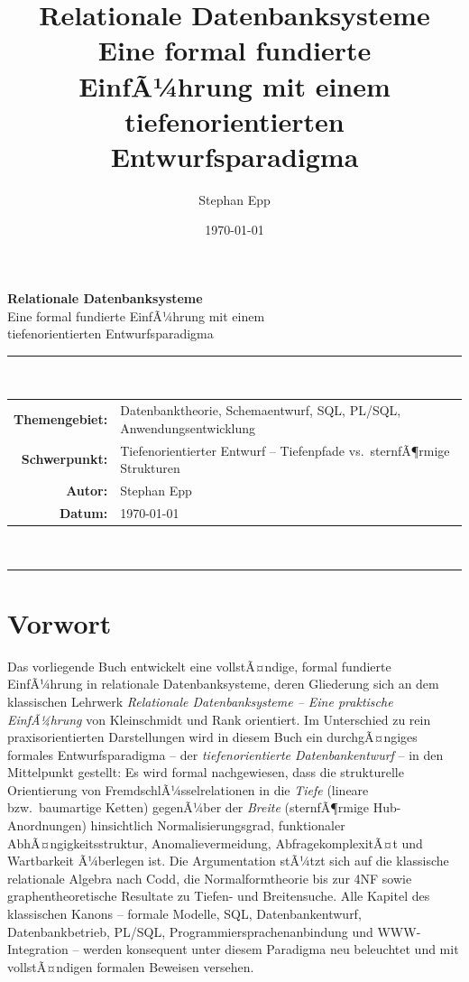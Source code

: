 ﻿\documentclass[a4paper,12pt]{report}
\title{Relationale Datenbanksysteme \\ \large Eine formal fundierte EinfÃ¼hrung mit
einem tiefenorientierten Entwurfsparadigma}
\author{Stephan Epp}
\date{\today}
\theoremstyle{definition}
\theoremstyle{remark}
\begin{document}
\begin{titlepage}
  \centering
  \vspace*{2cm}
  {\LARGE\bfseries Relationale Datenbanksysteme}\\[0.5em]
  {\Large Eine formal fundierte EinfÃ¼hrung mit einem\\
  tiefenorientierten Entwurfsparadigma}
  \vspace{1.5cm}

  \rule{\textwidth}{0.4pt}\\[0.5em]
  \begin{tabular}{@{}r p{11cm}@{}}
    \textbf{Themengebiet:} & Datenbanktheorie, Schemaentwurf, SQL, PL/SQL, Anwendungsentwicklung \\[2pt]
    \textbf{Schwerpunkt:}  & Tiefenorientierter Entwurf -- Tiefenpfade vs.\ sternfÃ¶rmige Strukturen \\[2pt]
    \textbf{Autor:}        & Stephan Epp \\[2pt]
    \textbf{Datum:}        & \today \\
  \end{tabular}\\[0.5em]
  \rule{\textwidth}{0.4pt}
  \vfill
\end{titlepage}

\tableofcontents

\chapter*{Vorwort}

Das vorliegende Buch entwickelt eine vollstÃ¤ndige, formal fundierte
EinfÃ¼hrung in relationale Datenbanksysteme, deren Gliederung sich an dem
klassischen Lehrwerk \emph{Relationale Datenbanksysteme -- Eine praktische
EinfÃ¼hrung} von Kleinschmidt und Rank orientiert. Im Unterschied zu rein
praxisorientierten Darstellungen wird in diesem Buch ein durchgÃ¤ngiges
formales Entwurfsparadigma -- der \emph{tiefenorientierte Datenbankentwurf}
-- in den Mittelpunkt gestellt: Es wird formal nachgewiesen, dass die
strukturelle Orientierung von FremdschlÃ¼sselrelationen in die \emph{Tiefe}
(lineare bzw.\ baumartige Ketten) gegenÃ¼ber der \emph{Breite}
(sternfÃ¶rmige Hub-Anordnungen) hinsichtlich Normalisierungsgrad,
funktionaler AbhÃ¤ngigkeitsstruktur, Anomalievermeidung,
AbfragekomplexitÃ¤t und Wartbarkeit Ã¼berlegen ist. Die Argumentation
stÃ¼tzt sich auf die klassische relationale Algebra nach Codd, die
Normalformtheorie bis zur 4NF sowie graphentheoretische Resultate zu
Tiefen- und Breitensuche. Alle Kapitel des klassischen Kanons --
formale Modelle, SQL, Datenbankentwurf, Datenbankbetrieb, PL/SQL,
Programmiersprachenanbindung und WWW-Integration -- werden konsequent
unter diesem Paradigma neu beleuchtet und mit vollstÃ¤ndigen formalen
Beweisen versehen.
\end{document}
